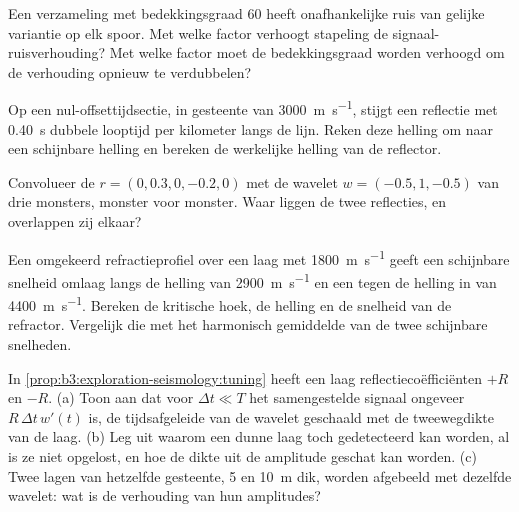 \begin{exercise}[$\star\star$]\label{exo:b3:exploration-seismology:7}
Een verzameling met bedekkingsgraad 60 heeft onafhankelijke ruis van gelijke variantie op elk spoor. Met
welke factor verhoogt stapeling de signaal-ruisverhouding? Met welke factor moet
de bedekkingsgraad worden verhoogd om de verhouding opnieuw te verdubbelen?
\end{exercise}

\begin{exercise}[$\star\star$]\label{exo:b3:exploration-seismology:8}
Op een nul-offsettijdsectie, in gesteente van \qty{3000}{m.s^{-1}}, stijgt een reflectie
met \qty{0.40}{s} dubbele looptijd per kilometer langs de lijn. Reken deze
helling om naar een schijnbare helling en bereken de werkelijke helling van de reflector.
\end{exercise}

\begin{exercise}[$\star\star$]\label{exo:b3:exploration-seismology:9}
Convolueer de  $r = (0, 0.3, 0, -0.2, 0)$ met de
wavelet $w = (-0.5, 1, -0.5)$ van drie monsters, monster voor monster. Waar liggen de twee
reflecties, en overlappen zij elkaar?
\end{exercise}

\begin{exercise}[$\star\star\star$]\label{exo:b3:exploration-seismology:10}
Een omgekeerd refractieprofiel over een laag met \qty{1800}{m.s^{-1}} geeft een
schijnbare snelheid omlaag langs de helling van \qty{2900}{m.s^{-1}} en een tegen de helling in van
\qty{4400}{m.s^{-1}}. Bereken de kritische hoek, de helling en de
snelheid van de refractor. Vergelijk die met het harmonisch gemiddelde van de twee
schijnbare snelheden.
\end{exercise}

\begin{exercise}[$\star\star\star$]\label{exo:b3:exploration-seismology:11}
In \cref{prop:b3:exploration-seismology:tuning} heeft een laag
reflectiecoëfficiënten $+R$ en $-R$. (a) Toon aan dat voor $\Delta t \ll T$ het samengestelde
signaal ongeveer $R\,\Delta t\,w'(t)$ is, de tijdsafgeleide van de wavelet
geschaald met de tweewegdikte van de laag. (b) Leg uit waarom een dunne laag toch
gedetecteerd kan worden, al is ze niet opgelost, en hoe de dikte uit de amplitude
geschat kan worden. (c) Twee lagen van hetzelfde gesteente, 5 en \qty{10}{m} dik, worden
afgebeeld met dezelfde wavelet: wat is de verhouding van hun amplitudes?
\end{exercise}

